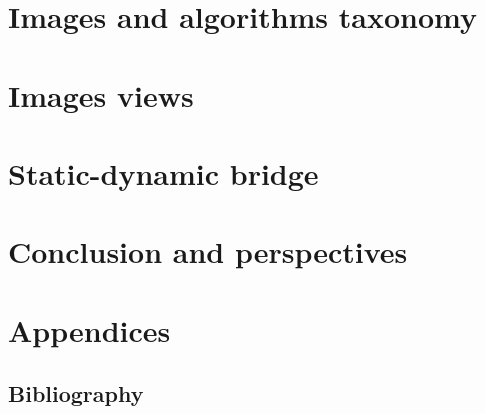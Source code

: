 \documentclass[11pt]{book}
\begin{document}


\cleardoublepage


\part{Images and algorithms taxonomy}
\label{part.image_and_algorithms_taxonomy}



\cleardoublepage


\part{Images views}
\label{part.image_views}



\cleardoublepage


\part{Static-dynamic bridge}
\label{part.static_dynamic_bridge}



\cleardoublepage


\part{Conclusion and perspectives}
\label{part.conclusion_and_perspecitves}



\cleardoublepage


\part{Appendices}
\label{part.annexes}

\appendix

\chapter{Bibliography}
\label{chap.bibliography}



\end{document}
